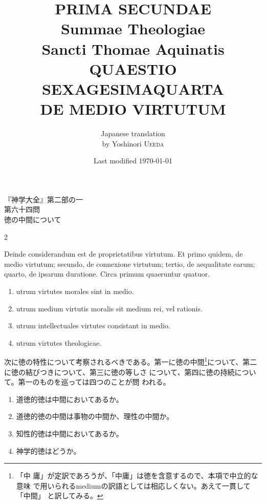 \documentclass[paper=a4paper,fontsize=10pt,jafontsize=9pt,titlepage]{jlreq}
\title{{\bfseries PRIMA SECUNDAE}\\{\Huge Summae Theologiae}\\Sancti Thomae
Aquinatis\\{\sffamily QUAESTIO SEXAGESIMAQUARTA}\\DE MEDIO VIRTUTUM}
\author{Japanese translation\\by Yoshinori {\scshape Ueeda}}
\date{Last modified \today}
\begin{document}
\maketitle
\thispagestyle{empty}

\begin{center}
{\LARGE 『神学大全』第二部の一}\\
{\Large 第六十四問\\徳の中間について}
\end{center}

\begin{paracol}{2}

Deinde considerandum est de proprietatibus virtutum. Et primo quidem,
de medio virtutum; secundo, de connexione virtutum; tertio, de
aequalitate earum; quarto, de ipsarum duratione. Circa primum
quaeruntur quatuor. 

\begin{enumerate}
 \item utrum virtutes morales sint in medio.
 \item utrum medium virtutis moralis sit medium rei, vel rationis.
 \item utrum intellectuales virtutes consistant in medio.
 \item utrum virtutes theologicae.
\end{enumerate}

\switchcolumn

次に徳の特性について考察されるべきである。第一に徳の中間\footnote{「中
 庸」が定訳であろうが、「中庸」は徳を含意するので、本項で中立的な意味
 で用いられるmediumの訳語としては相応しくない。あえて一貫して「中間」
 と訳してみる。}について、第二に徳の結びつきについて、第三に徳の等しさ
 について、第四に徳の持続について。第一のものを巡っては四つのことが問
 われる。

\begin{enumerate}
 \item 道徳的徳は中間においてあるか。
 \item 道徳的徳の中間は事物の中間か、理性の中間か。
 \item 知性的徳は中間においてあるか。
 \item 神学的徳はどうか。
\end{enumerate}

\end{paracol}

\newpage
{}
{}
\setcounter{section}{1}
\setcounter{subsection}{0}
\end{document}
